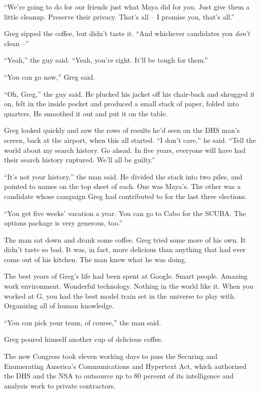 “We're going to do for our friends just what Maya did for you. Just 
give them a little cleanup. Preserve their privacy. That's all -- I 
promise you, that's all.”

Greg sipped the coffee, but didn't taste it. “And whichever 
candidates you \emph{don't} clean --”

“Yeah,” the guy said. “Yeah, you're right. It'll be tough for 
them.”

“You can go now,” Greg said.

“Oh, Greg,” the guy said. He plucked his jacket off his chair-back 
and shrugged it on, felt in the inside pocket and produced a small 
stack of paper, folded into quarters. He smoothed it out and put it on 
the table.

Greg looked quickly and saw the rows of results he'd seen on the DHS 
man's screen, back at the airport, when this all started. “I don't 
care,” he said. “Tell the world about my search history. Go ahead. 
In five years, everyone will have had their search history ruptured. 
We'll all be guilty.”

“It's not your history,” the man said. He divided the stack into 
two piles, and pointed to names on the top sheet of each. One was 
Maya's. The other was a candidate whose campaign Greg had contributed 
to for the last three elections.

“You get five weeks' vacation a year. You can go to Cabo for the 
SCUBA. The options package is very generous, too.”

The man sat down and drank some coffee. Greg tried some more of his 
own. It didn't taste so bad. It was, in fact, more delicious than 
anything that had ever come out of his kitchen. The man knew what he 
was doing.

The best years of Greg's life had been spent at Google. Smart people. 
Amazing work environment. Wonderful technology. Nothing in the world 
like it. When you worked at G, you had the best model train set in the 
universe to play with. Organizing all of human knowledge.

“You can pick your team, of course,” the man said.

Greg poured himself another cup of delicious coffee.

\tb

The new Congress took eleven working days to pass the Securing and 
Enumerating America's Communications and Hypertext Act, which 
authorized the DHS and the NSA to outsource up to 80 percent of its 
intelligence and analysis work to private contractors.


